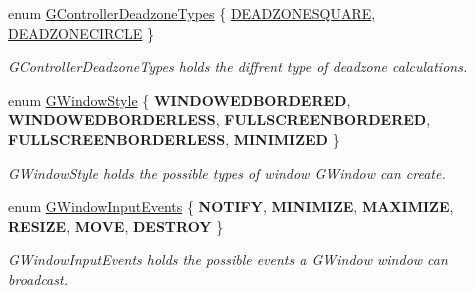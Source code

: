\begin{DoxyCompactItemize}
enum \mbox{\hyperlink{namespaceGW_1_1SYSTEM_a31011e5fdef70ea7c975794fe99319d4}{G\+Controller\+Deadzone\+Types}} \{ \mbox{\hyperlink{namespaceGW_1_1SYSTEM_a31011e5fdef70ea7c975794fe99319d4a2607a103270014a3cd2944001009848a}{D\+E\+A\+D\+Z\+O\+N\+E\+S\+Q\+U\+A\+RE}}, 
\mbox{\hyperlink{namespaceGW_1_1SYSTEM_a31011e5fdef70ea7c975794fe99319d4a96eca15634dfc446bcbf235e559052fa}{D\+E\+A\+D\+Z\+O\+N\+E\+C\+I\+R\+C\+LE}}
 \}
\begin{DoxyCompactList}\small\item\em G\+Controller\+Deadzone\+Types holds the diffrent type of deadzone calculations. \end{DoxyCompactList}\item 
\mbox{\label{namespaceGW_1_1SYSTEM_ad117891e556631f842625c348d36a071}} 
enum \mbox{\hyperlink{namespaceGW_1_1SYSTEM_ad117891e556631f842625c348d36a071}{G\+Window\+Style}} \{ \newline
{\bfseries W\+I\+N\+D\+O\+W\+E\+D\+B\+O\+R\+D\+E\+R\+ED}, 
{\bfseries W\+I\+N\+D\+O\+W\+E\+D\+B\+O\+R\+D\+E\+R\+L\+E\+SS}, 
{\bfseries F\+U\+L\+L\+S\+C\+R\+E\+E\+N\+B\+O\+R\+D\+E\+R\+ED}, 
{\bfseries F\+U\+L\+L\+S\+C\+R\+E\+E\+N\+B\+O\+R\+D\+E\+R\+L\+E\+SS}, 
\newline
{\bfseries M\+I\+N\+I\+M\+I\+Z\+ED}
 \}
\begin{DoxyCompactList}\small\item\em G\+Window\+Style holds the possible types of window G\+Window can create. \end{DoxyCompactList}\item 
\mbox{\label{namespaceGW_1_1SYSTEM_a7d3a00c7f94541cb6f446fde944ab309}} 
enum \mbox{\hyperlink{namespaceGW_1_1SYSTEM_a7d3a00c7f94541cb6f446fde944ab309}{G\+Window\+Input\+Events}} \{ \newline
{\bfseries N\+O\+T\+I\+FY}, 
{\bfseries M\+I\+N\+I\+M\+I\+ZE}, 
{\bfseries M\+A\+X\+I\+M\+I\+ZE}, 
{\bfseries R\+E\+S\+I\+ZE}, 
\newline
{\bfseries M\+O\+VE}, 
{\bfseries D\+E\+S\+T\+R\+OY}
 \}
\begin{DoxyCompactList}\small\item\em G\+Window\+Input\+Events holds the possible events a G\+Window window can broadcast. \end{DoxyCompactList}\end{DoxyCompactItemize}
